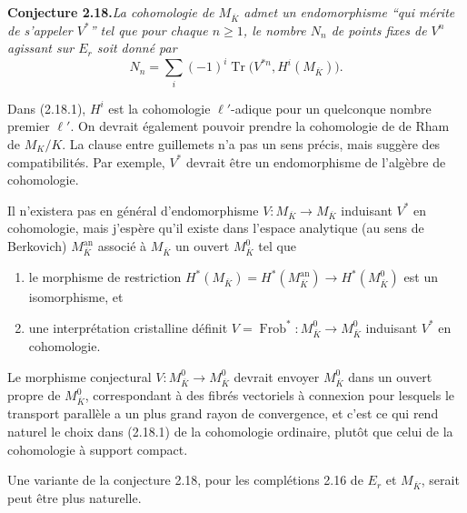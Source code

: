 \documentclass[11pt]{article}
\newcommand{\Frob}{\operatorname{Frob}}
\newcommand{\Tr}{\operatorname{Tr}}
\begin{document}
\noindent\textbf{Conjecture 2.18.}\quad\textit{La cohomologie de \(M_{\overline K}\) admet un endomorphisme ``qui mérite de s'appeler \(V^*\)'' tel que pour chaque \(n\geq 1\), le nombre \(N_n\) de points fixes de \(V^n\) agissant sur \(E_r\) soit donné par}
\begin{equation}
N_n=\sum_i(-1)^i\Tr\bigl(V^{*n},H^i(M_{\overline K})\bigr).
\tag{2.18.1}
\end{equation}

Dans (2.18.1), \(H^i\) est la cohomologie \(\ell'\)-adique pour un quelconque nombre premier \(\ell'\). On devrait également pouvoir prendre la cohomologie de de Rham de \(M_K/K\). La clause entre guillemets n'a pas un sens précis, mais suggère des compatibilités. Par exemple, \(V^*\) devrait être un endomorphisme de l'algèbre de cohomologie.

Il n'existera pas en général d'endomorphisme \(V:M_{\overline K}\to M_{\overline K}\) induisant \(V^*\) en cohomologie, mais j'espère qu'il existe dans l'espace analytique (au sens de Berkovich) \(M_{\overline K}^{\mathrm{an}}\) associé à \(M_{\overline K}\) un ouvert \(M_{\overline K}^0\) tel que
\begin{enumerate}[label=(\alph*),leftmargin=2.5em]
\item le morphisme de restriction \(H^*(M_{\overline K})=H^*(M_{\overline K}^{\mathrm{an}})\to H^*(M_{\overline K}^0)\) est un isomorphisme, et
\item une interprétation cristalline définit \(V=\Frob^*:M_{\overline K}^0\to M_{\overline K}^0\) induisant \(V^*\) en cohomologie.
\end{enumerate}
Le morphisme conjectural \(V:M_{\overline K}^0\to M_{\overline K}^0\) devrait envoyer \(M_{\overline K}^0\) dans un ouvert propre de \(M_{\overline K}^0\), correspondant à des fibrés vectoriels à connexion pour lesquels le transport parallèle a un plus grand rayon de convergence, et c'est ce qui rend naturel le choix dans (2.18.1) de la cohomologie ordinaire, plutôt que celui de la cohomologie à support compact.

Une variante de la conjecture 2.18, pour les complétions 2.16 de \(E_r\) et \(M_{\overline K}\), serait peut être plus naturelle.
\end{document}
